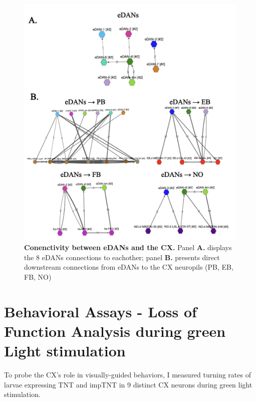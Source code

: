         \begin{figure}[H]
            \centering
            \includegraphics[width=12cm]{Figs/CX/eDANstoCX.pdf}
            \caption[eDANs Connections to the CX]{\textbf{Conenctivity between eDANs and the CX.} Panel \textbf{A.} displays the 8 eDANs connections to eachother; panel \textbf{B.} presents direct downstream connections from eDANs to the CX neuropils (PB, EB, FB, NO)}
            \label{eDANstoCX}
        \end{figure}


\section{Behavioral Assays - Loss of Function Analysis during green Light stimulation}

         To probe the CX's role in visually-guided behaviors, I measured turning rates of larvae expressing TNT and impTNT in 9 distinct CX neurons during green light stimulation.  
         

